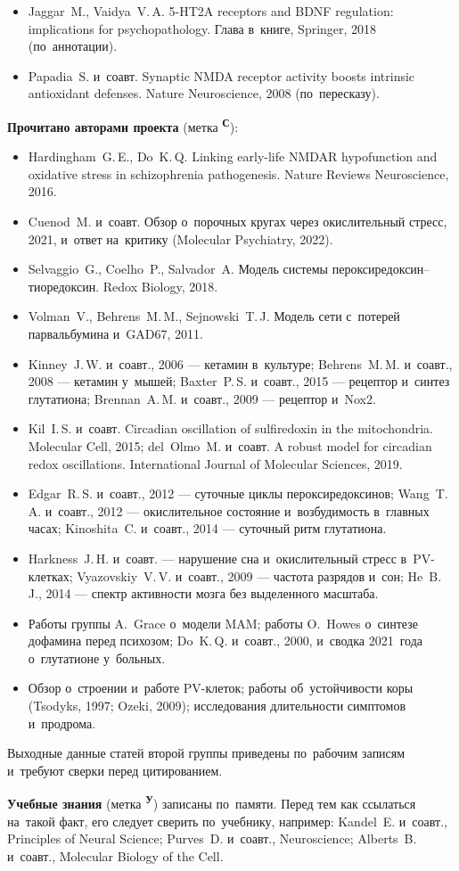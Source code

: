 \documentclass[11pt,a4paper,landscape,twocolumn]{article}
\newcommand{\tU}{\textsuperscript{\sffamily\bfseries\color{cM}У}}
\newcommand{\tS}{\textsuperscript{\sffamily\bfseries\color{cB}С}}
\begin{document}
{\begin{itemize}
\item Jaggar~M., Vaidya~V.\,A. 5-HT2A receptors and BDNF regulation: implications for psychopathology. Глава в~книге, Springer, 2018 (по~аннотации).
\item Papadia~S. и~соавт. Synaptic NMDA receptor activity boosts intrinsic antioxidant defenses. Nature Neuroscience, 2008 (по~пересказу).
\end{itemize}
\textbf{Прочитано авторами проекта} (метка \tS):
\begin{itemize}
\item Hardingham~G.\,E., Do~K.\,Q. Linking early-life NMDAR hypofunction and oxidative stress in schizophrenia pathogenesis. Nature Reviews Neuroscience, 2016.
\item Cuenod~M. и~соавт. Обзор о~порочных кругах через окислительный стресс, 2021, и~ответ на~критику (Molecular Psychiatry, 2022).
\item Selvaggio~G., Coelho~P., Salvador~A. Модель системы пероксиредоксин–тиоредоксин. Redox Biology, 2018.
\item Volman~V., Behrens~M.\,M., Sejnowski~T.\,J. Модель сети с~потерей парвальбумина и~GAD67, 2011.
\item Kinney~J.\,W. и~соавт., 2006 — кетамин в~культуре; Behrens~M.\,M. и~соавт., 2008 — кетамин у~мышей; Baxter~P.\,S. и~соавт., 2015 — рецептор и~синтез глутатиона; Brennan~A.\,M. и~соавт., 2009 — рецептор и~Nox2.
\item Kil~I.\,S. и~соавт. Circadian oscillation of sulfiredoxin in the mitochondria. Molecular Cell, 2015; del~Olmo~M. и~соавт. A robust model for circadian redox oscillations. International Journal of Molecular Sciences, 2019.
\item Edgar~R.\,S. и~соавт., 2012 — суточные циклы пероксиредоксинов; Wang~T.\,A. и~соавт., 2012 — окислительное состояние и~возбудимость в~главных часах; Kinoshita~C. и~соавт., 2014 — суточный ритм глутатиона.
\item Harkness~J.\,H. и~соавт. — нарушение сна и~окислительный стресс в~PV-клетках; Vyazovskiy~V.\,V. и~соавт., 2009 — частота разрядов и~сон; He~B.\,J., 2014 — спектр активности мозга без выделенного масштаба.
\item Работы группы A.~Grace о~модели MAM; работы O.~Howes о~синтезе дофамина перед психозом; Do~K.\,Q. и~соавт., 2000, и~сводка 2021~года о~глутатионе у~больных.
\item Обзор о~строении и~работе PV-клеток; работы об~устойчивости коры (Tsodyks, 1997; Ozeki, 2009); исследования длительности симптомов и~продрома.
\end{itemize}
Выходные данные статей второй группы приведены по~рабочим записям и~требуют сверки перед цитированием.

\textbf{Учебные знания} (метка \tU) записаны по~памяти. Перед тем как ссылаться на~такой факт, его следует сверить по~учебнику, например: Kandel~E. и~соавт., Principles of Neural Science; Purves~D. и~соавт., Neuroscience; Alberts~B. и~соавт., Molecular Biology of the Cell.
}
\end{document}
